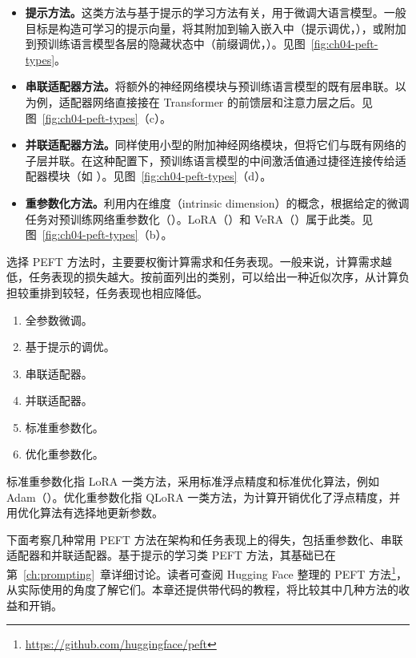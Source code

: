 \begin{itemize}
\item \textbf{提示方法。}这类方法与基于提示的学习方法有关，用于微调大语言模型。一般目标是构造可学习的提示向量，将其附加到输入嵌入中（提示调优，），或附加到预训练语言模型各层的隐藏状态中（前缀调优，）。见图~\ref{fig:ch04-peft-types}。
\item \textbf{串联适配器方法。}将额外的神经网络模块与预训练语言模型的既有层串联。以 为例，适配器网络直接接在 Transformer 的前馈层和注意力层之后。见图~\ref{fig:ch04-peft-types}（c）。
\item \textbf{并联适配器方法。}同样使用小型的附加神经网络模块，但将它们与既有网络的子层并联。在这种配置下，预训练语言模型的中间激活值通过捷径连接传给适配器模块（如 ）。见图~\ref{fig:ch04-peft-types}（d）。
\item \textbf{重参数化方法。}利用内在维度（intrinsic dimension）的概念，根据给定的微调任务对预训练网络重参数化（）。LoRA（）和 VeRA（）属于此类。见图~\ref{fig:ch04-peft-types}（b）。
\end{itemize}

\begin{practicaltip}
选择 PEFT 方法时，主要要权衡计算需求和任务表现。一般来说，计算需求越低，任务表现的损失越大。按前面列出的类别，可以给出一种近似次序，从计算负担较重排到较轻，任务表现也相应降低。

\begin{enumerate}
\item 全参数微调。
\item 基于提示的调优。
\item 串联适配器。
\item 并联适配器。
\item 标准重参数化。
\item 优化重参数化。
\end{enumerate}

标准重参数化指 LoRA 一类方法，采用标准浮点精度和标准优化算法，例如 Adam（）。优化重参数化指 QLoRA 一类方法，为计算开销优化了浮点精度，并用优化算法有选择地更新参数。
\end{practicaltip}

下面考察几种常用 PEFT 方法在架构和任务表现上的得失，包括重参数化、串联适配器和并联适配器。基于提示的学习类 PEFT 方法，其基础已在第~\ref{ch:prompting}~章详细讨论。读者可查阅 Hugging Face 整理的 PEFT 方法\footnote{\url{https://github.com/huggingface/peft}}，从实际使用的角度了解它们。本章还提供带代码的教程，将比较其中几种方法的收益和开销。

